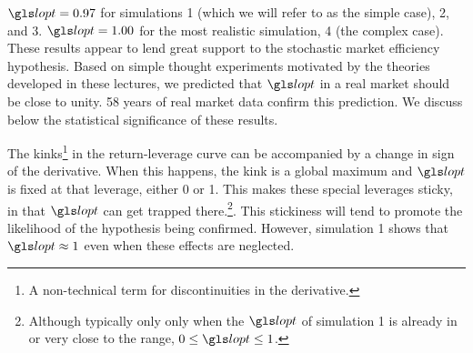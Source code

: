 $\lopt=0.97$ for simulations 1 (which we will refer to as the simple case), 2, and 3. $\lopt=1.00$ for the most realistic simulation, 4 (the complex case). These results appear to lend great support to the stochastic market efficiency hypothesis. Based on simple thought experiments motivated by the theories developed in these lectures, we predicted that $\lopt$ in a real market should be close to unity. 58 years of real market data confirm this prediction. We discuss below the statistical significance of these results.

The kinks\footnote{A non-technical term for discontinuities in the derivative.} in the return-leverage curve can be accompanied by a change in sign of the derivative. When this happens, the kink is a global maximum and $\lopt$ is fixed at that leverage, either 0 or 1. This makes these special leverages sticky, in that $\lopt$ can get trapped there.\footnote{Although typically only only when the $\lopt$ of simulation 1 is already in or very close to the range, $0\leq\lopt\leq1$.}. This stickiness will tend to promote the likelihood of the hypothesis being confirmed. However, simulation 1 shows that $\lopt\approx1$ even when these effects are neglected.

